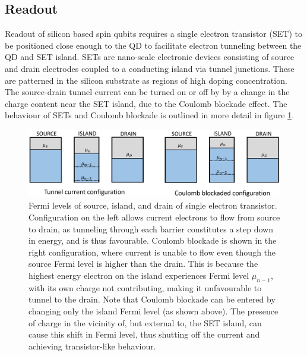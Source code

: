 \documentclass[../Thesis.tex]{subfiles}
\begin{document}
\subsection{Readout}
Readout of silicon based spin qubits requires a single electron transistor (SET) to be positioned close enough to the QD to facilitate electron tunneling between the QD and SET island. SETs are nano-scale electronic devices consisting of source and drain electrodes coupled to a conducting island via tunnel junctions. These are patterned in the silicon substrate as regions of high doping concentration. The source-drain tunnel current can be turned on or off by by a change in the charge content near the SET island, due to the Coulomb blockade effect. The behaviour of SETs and Coulomb blockade is outlined in more detail in figure \ref{fig:coulomb-blockade}.

\begin{figure}
    \centering
    \includegraphics[width=14cm]{graphics/Introduction/coulomb_blockade.PNG}
    \caption{Fermi levels of source, island, and drain of single electron transistor. Configuration on the left allows current electrons to flow from source to drain, as tunneling through each barrier constitutes a step down in energy, and is thus favourable. Coulomb blockade is shown in the right configuration, where current is unable to flow even though the source Fermi level is higher than the drain. This is because the highest energy electron on the island experiences Fermi level $\mu_{n-1}$, with its own charge not contributing, making it unfavourable to tunnel to the drain. Note that Coulomb blockade can be entered by changing only the island Fermi level (as shown above). The presence of charge in the vicinity of, but external to, the SET island, can cause this shift in Fermi level, thus shutting off the current and achieving transistor-like behaviour.}
    \label{fig:coulomb-blockade}
\end{figure}
\end{document}
